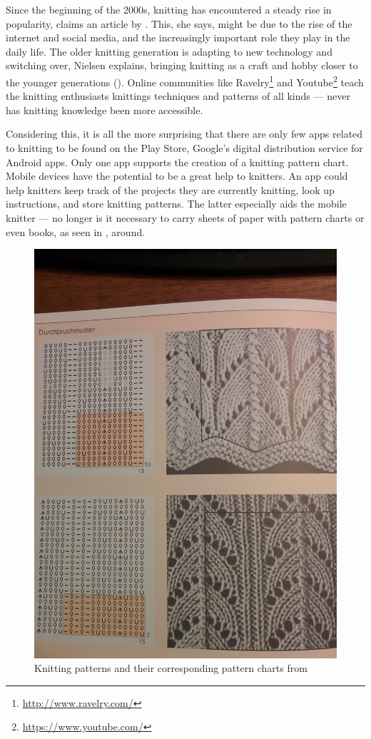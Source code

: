 Since the beginning of the 2000s, knitting has encountered a steady rise in popularity, claims an article by \cite{lewis_rise_of_knitting}. This, she says, might be due to the rise of the internet and social media, and the increasingly important role they play in the daily life. The older knitting generation is adapting to new technology and switching over, Nielsen explains, bringing knitting as a craft and hobby closer to the younger generations (\cite{lewis_rise_of_knitting}). Online communities like Ravelry\footnote{\url{http://www.ravelry.com/}} and Youtube\footnote{\url{https://www.youtube.com/}} teach the knitting enthusiasts knittings techniques and patterns of all kinds --- never has knitting knowledge been more accessible.

Considering this, it is all the more surprising that there are only few apps related to knitting to be found on the Play Store, Google's digital distribution service for Android apps. Only one app supports the creation of a knitting pattern chart. Mobile devices have the potential to be a great help to knitters. An app could help knitters keep track of the projects they are currently knitting, look up instructions, and store knitting patterns. The latter especially aids the mobile knitter --- no longer is it necessary to carry sheets of paper with pattern charts or even books, as seen in , around.

\begin{figure}[H]
	\centering
    \includegraphics[width=.45\textwidth]{images/knitting_pattern_chart_book.jpg}
   \caption[{Knitting patterns and their corresponding pattern charts \protect{}}]{Knitting patterns and their corresponding pattern charts from \protect\cite[p142]{Natter1983}}
   \label{fig:knitting_book}
\end{figure}

